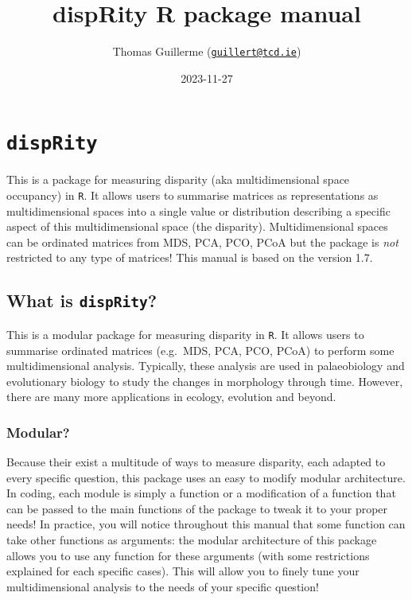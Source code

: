 \documentclass[
]{book}
\title{dispRity R package manual}
\author{Thomas Guillerme (\href{mailto:guillert@tcd.ie}{\nolinkurl{guillert@tcd.ie}})}
\date{2023-11-27}
\begin{document}
\maketitle

{
\setcounter{tocdepth}{1}
\tableofcontents
}
\hypertarget{disprity}{%
\chapter{\texorpdfstring{\texttt{dispRity}}{dispRity}}\label{disprity}}

This is a package for measuring disparity (aka multidimensional space occupancy) in \texttt{R}.
It allows users to summarise matrices as representations as multidimensional spaces into a single value or distribution describing a specific aspect of this multidimensional space (the disparity).
Multidimensional spaces can be ordinated matrices from MDS, PCA, PCO, PCoA but the package is \emph{not} restricted to any type of matrices!
This manual is based on the version 1.7.

\hypertarget{what-is-disprity}{%
\section{\texorpdfstring{What is \texttt{dispRity}?}{What is dispRity?}}\label{what-is-disprity}}

This is a modular package for measuring disparity in \texttt{R}.
It allows users to summarise ordinated matrices (e.g.~MDS, PCA, PCO, PCoA) to perform some multidimensional analysis.
Typically, these analysis are used in palaeobiology and evolutionary biology to study the changes in morphology through time.
However, there are many more applications in ecology, evolution and beyond.

\hypertarget{modular}{%
\subsection{Modular?}\label{modular}}

Because their exist a multitude of ways to measure disparity, each adapted to every specific question, this package uses an easy to modify modular architecture.
In coding, each module is simply a function or a modification of a function that can be passed to the main functions of the package to tweak it to your proper needs!
In practice, you will notice throughout this manual that some function can take other functions as arguments: the modular architecture of this package allows you to use any function for these arguments (with some restrictions explained for each specific cases).
This will allow you to finely tune your multidimensional analysis to the needs of your specific question!
\end{document}
